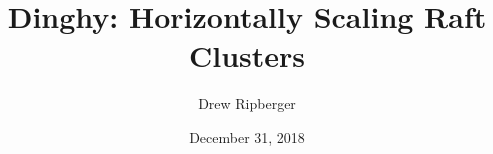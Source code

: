 \documentclass[11pt, twocolumn]{article}
\title{Dinghy: Horizontally Scaling Raft Clusters}
\author{Drew Ripberger}
\date{December 31, 2018}
\begin{document}
  \maketitle
  \textbf{}
  
  
  
  
  
  
  
\end{document}
